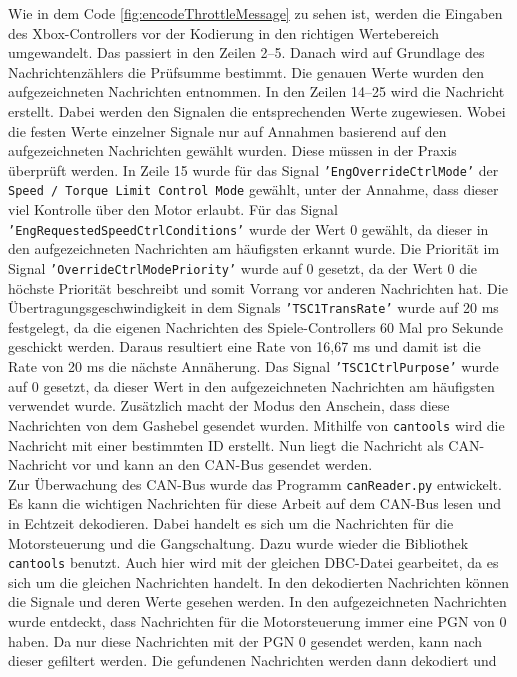 Wie in dem Code \ref{fig:encodeThrottleMessage} zu sehen ist, werden die Eingaben des Xbox-Controllers vor der Kodierung in den richtigen Wertebereich umgewandelt.
Das passiert in den Zeilen 2--5. Danach wird auf Grundlage des Nachrichtenzählers die Prüfsumme bestimmt. Die genauen Werte wurden 
den aufgezeichneten Nachrichten entnommen. In den Zeilen 14--25 wird die Nachricht erstellt. Dabei werden den Signalen die entsprechenden
Werte zugewiesen. Wobei die festen Werte einzelner Signale nur auf Annahmen basierend auf den aufgezeichneten Nachrichten gewählt wurden.
Diese müssen in der Praxis überprüft werden. In Zeile 15 wurde für das Signal \texttt{'EngOverrideCtrlMode'} der 
\texttt{Speed / Torque Limit Control Mode} gewählt, unter der Annahme, dass dieser viel Kontrolle über den Motor erlaubt.
Für das Signal \texttt{'EngRequestedSpeedCtrlConditions'} wurde der Wert 0 gewählt, da dieser in den aufgezeichneten Nachrichten
am häufigsten erkannt wurde. Die Priorität im Signal \texttt{'OverrideCtrlModePriority'} wurde auf 0 gesetzt, da der Wert 0 die 
höchste Priorität beschreibt und somit Vorrang vor anderen Nachrichten hat. Die Übertragungsgeschwindigkeit 
in dem Signals \texttt{'TSC1TransRate'} wurde auf 20 ms festgelegt, da die eigenen Nachrichten des Spiele-Controllers
60 Mal pro Sekunde geschickt werden. Daraus resultiert eine Rate von 16,67 ms und damit ist die Rate von 20 ms die nächste
Annäherung. Das Signal \texttt{'TSC1CtrlPurpose'} wurde auf 0 gesetzt, da dieser Wert in den aufgezeichneten Nachrichten
am häufigsten verwendet wurde. Zusätzlich macht der Modus den Anschein, dass diese Nachrichten von dem Gashebel gesendet wurden. 
Mithilfe von \texttt{cantools} wird die Nachricht mit einer bestimmten ID erstellt. Nun liegt die Nachricht als
CAN-Nachricht vor und kann an den CAN-Bus gesendet werden.
\\
Zur Überwachung des CAN-Bus wurde das Programm \texttt{canReader.py} entwickelt. Es kann die wichtigen Nachrichten für diese Arbeit 
auf dem CAN-Bus lesen und in Echtzeit dekodieren. Dabei handelt es sich um die Nachrichten für die Motorsteuerung und die Gangschaltung.
Dazu wurde wieder die Bibliothek \texttt{cantools} benutzt. Auch hier wird
mit der gleichen DBC-Datei gearbeitet, da es sich um die gleichen Nachrichten handelt. In den dekodierten Nachrichten
können die Signale und deren Werte gesehen werden. 
In den aufgezeichneten Nachrichten wurde entdeckt, dass Nachrichten für die Motorsteuerung
immer eine PGN von 0 haben. Da nur diese Nachrichten
mit der PGN 0 gesendet werden, kann nach dieser gefiltert werden. Die gefundenen Nachrichten werden dann dekodiert und
